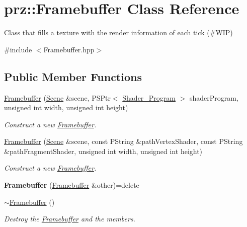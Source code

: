 \hypertarget{classprz_1_1_framebuffer}{}\section{prz\+::Framebuffer Class Reference}
\label{classprz_1_1_framebuffer}


Class that fills a texture with the render information of each tick (\#\+W\+IP)  




{\ttfamily \#include $<$Framebuffer.\+hpp$>$}

\subsection*{Public Member Functions}
\begin{DoxyCompactItemize}
\item 
\mbox{\hyperlink{classprz_1_1_framebuffer_a9cf6e1feea186d1e71de03ea25d18e58}{Framebuffer}} (\mbox{\hyperlink{classprz_1_1_scene}{Scene}} \&scene, P\+S\+Ptr$<$ \mbox{\hyperlink{classprz_1_1_shader___program}{Shader\+\_\+\+Program}} $>$ shader\+Program, unsigned int width, unsigned int height)
\begin{DoxyCompactList}\small\item\em Construct a new \mbox{\hyperlink{classprz_1_1_framebuffer}{Framebuffer}}. \end{DoxyCompactList}\item 
\mbox{\hyperlink{classprz_1_1_framebuffer_a5a35479fa4cda9ab2e01497b874dad94}{Framebuffer}} (\mbox{\hyperlink{classprz_1_1_scene}{Scene}} \&scene, const P\+String \&path\+Vertex\+Shader, const P\+String \&path\+Fragment\+Shader, unsigned int width, unsigned int height)
\begin{DoxyCompactList}\small\item\em Construct a new \mbox{\hyperlink{classprz_1_1_framebuffer}{Framebuffer}}. \end{DoxyCompactList}\item 
\mbox{\label{classprz_1_1_framebuffer_abbf44c6e80b09d6653a25c55d9374ec5}} 
{\bfseries Framebuffer} (\mbox{\hyperlink{classprz_1_1_framebuffer}{Framebuffer}} \&other)=delete
\item 
\mbox{\hyperlink{classprz_1_1_framebuffer_a9bbd1410101d54761fc26520fea3c61d}{$\sim$\+Framebuffer}} ()
\begin{DoxyCompactList}\small\item\em Destroy the \mbox{\hyperlink{classprz_1_1_framebuffer}{Framebuffer}} and the members. \end{DoxyCompactList}\item 

\end{DoxyCompactItemize}
